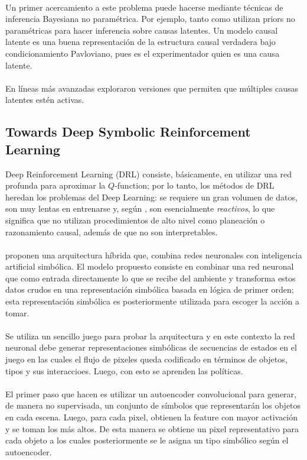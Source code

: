 \documentclass[11pt]{article}
\theoremstyle{plain}
\begin{document}
\\
Un primer acercamiento a este problema puede hacerse mediante técnicas de inferencia Bayesiana no paramétrica. Por ejemplo, tanto \cite{gershman2010learning} como \cite{gershman2012exploring} utilizan priors no paramétricas para hacer inferencia sobre causas latentes. Un modelo causal latente es una buena representación de la estructura causal verdadera bajo condicionamiento Pavloviano, pues es el experimentador quien es una causa latente.\\
\\
En líneas más avanzadas \cite{courville2006bayesian} exploraron versiones que permiten que múltiples causas latentes estén activas.

\subsection{Towards Deep Symbolic Reinforcement Learning}
Deep Reinforcement Learning (DRL) consiste, básicamente, en utilizar una red profunda para aproximar la $Q$-function; por lo tanto, los métodos de DRL heredan los problemas del Deep Learning: se requiere un gran volumen de datos, son muy lentas en entrenarse y, según \cite{garnelo2016towards}, son esencialmente \textit{reactivos}, lo que significa que no utilizan procedimientos de alto nivel como planeación o razonamiento causal, además de que no son interpretables.\\
\\
\cite{garnelo2016towards} proponen una arquitectura híbrida que, combina redes neuronales con inteligencia artificial simbólica. El modelo propuesto consiste en combinar una red neuronal que como entrada directamente lo que se recibe del ambiente y transforma estos datos crudos en una representación simbólica basada en lógica de primer orden; esta representación simbólica es posteriormente utilizada para escoger la acción a tomar.\\
\\
Se utiliza un sencillo juego para probar la arquitectura y en este contexto la red neuronal debe generar representaciones simbólicas de secuencias de estados en el juego en las cuales el flujo de pixeles queda codificado en términos de objetos, tipos y sus interaccioes. Luego, con esto se aprenden las políticas.\\
\\
El primer paso que hacen es utilizar un autoencoder convolucional para generar, de manera no supervisada, un conjunto de símbolos que representarán los objetos en cada escena. Luego, para cada pixel, obtienen la feature con mayor activación y se toman los más altos. De esta manera se obtiene un pixel representativo para cada objeto a los cuales posteriormente se le asigna un tipo simbólico según el autoencoder.\\
\end{document}
